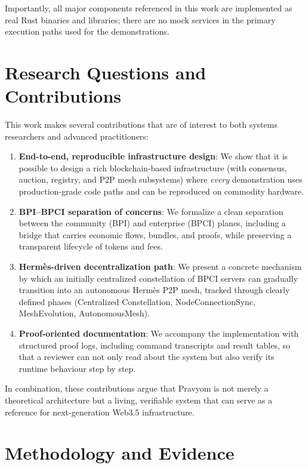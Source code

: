 Importantly, all major components referenced in this work are implemented as real Rust binaries and libraries; there are no mock services in the primary execution paths used for the demonstrations.

\section{Research Questions and Contributions}

This work makes several contributions that are of interest to both systems researchers and advanced practitioners:

\begin{enumerate}
  \item \textbf{End-to-end, reproducible infrastructure design}: We show that it is possible to design a rich blockchain-based infrastructure (with consensus, auction, registry, and P2P mesh subsystems) where \emph{every} demonstration uses production-grade code paths and can be reproduced on commodity hardware.
  \item \textbf{BPI--BPCI separation of concerns}: We formalize a clean separation between the community (BPI) and enterprise (BPCI) planes, including a bridge that carries economic flows, bundles, and proofs, while preserving a transparent lifecycle of tokens and fees.
  \item \textbf{Herm\`es-driven decentralization path}: We present a concrete mechanism by which an initially centralized constellation of BPCI servers can gradually transition into an autonomous Herm\`es P2P mesh, tracked through clearly defined phases (Centralized Constellation, NodeConnectionSync, MeshEvolution, AutonomousMesh).
  \item \textbf{Proof-oriented documentation}: We accompany the implementation with structured proof logs, including command transcripts and result tables, so that a reviewer can not only read about the system but also verify its runtime behaviour step by step.
\end{enumerate}

In combination, these contributions argue that Pravyom is not merely a theoretical architecture but a living, verifiable system that can serve as a reference for next-generation Web3.5 infrastructure.

\section{Methodology and Evidence}

